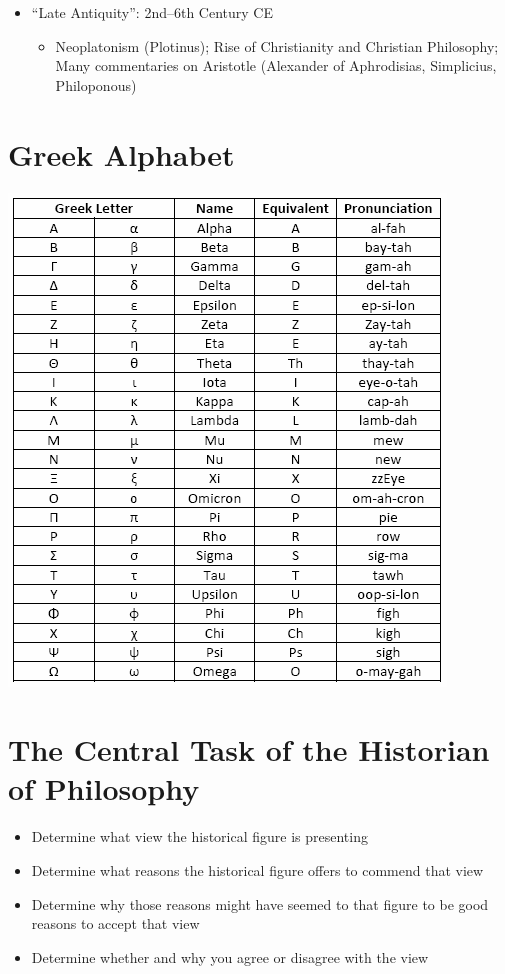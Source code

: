 \documentclass[11pt]{article}
\begin{document}
\begin{itemize}
\begin{itemize}
\end{itemize}
\item{``Late Antiquity'': 2nd--6th Century CE}
\begin{itemize}
\item{Neoplatonism (Plotinus); Rise of Christianity and Christian Philosophy; Many commentaries on Aristotle (Alexander of Aphrodisias, Simplicius, Philoponous)}
\end{itemize}
\end{itemize}



\section*{Greek Alphabet}

\includegraphics{apha.png}






\section*{The Central Task of the Historian of Philosophy}

\begin{itemize}
\item{Determine what view the historical figure is presenting}
\item{Determine what reasons the historical figure offers to commend that view}
\item{Determine why those reasons might have seemed to that figure to be good reasons to accept that view}
\item{Determine whether and why you agree or disagree with the view}
\end{itemize}
\end{document}
